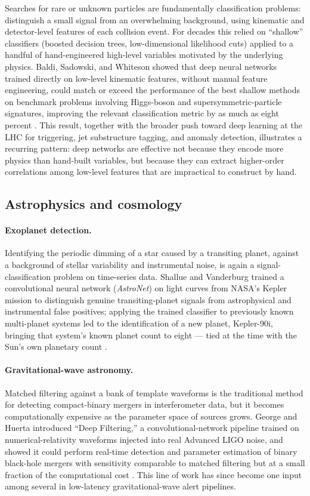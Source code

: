 \documentclass[11pt]{article}
\begin{document}
Searches for rare or unknown particles are fundamentally classification problems: distinguish a small signal from an overwhelming background, using kinematic and detector-level features of each collision event. For decades this relied on ``shallow'' classifiers (boosted decision trees, low-dimensional likelihood cuts) applied to a handful of hand-engineered high-level variables motivated by the underlying physics. Baldi, Sadowski, and Whiteson showed that deep neural networks trained directly on low-level kinematic features, without manual feature engineering, could match or exceed the performance of the best shallow methods on benchmark problems involving Higgs-boson and supersymmetric-particle signatures, improving the relevant classification metric by as much as eight percent \cite{baldi2014}. This result, together with the broader push toward deep learning at the LHC for triggering, jet substructure tagging, and anomaly detection, illustrates a recurring pattern: deep networks are effective not because they encode more physics than hand-built variables, but because they can extract higher-order correlations among low-level features that are impractical to construct by hand.

\subsection{Astrophysics and cosmology}

\paragraph{Exoplanet detection.} Identifying the periodic dimming of a star caused by a transiting planet, against a background of stellar variability and instrumental noise, is again a signal-classification problem on time-series data. Shallue and Vanderburg trained a convolutional neural network (\emph{AstroNet}) on light curves from NASA's Kepler mission to distinguish genuine transiting-planet signals from astrophysical and instrumental false positives; applying the trained classifier to previously known multi-planet systems led to the identification of a new planet, Kepler-90i, bringing that system's known planet count to eight --- tied at the time with the Sun's own planetary count \cite{shallue2018}.

\paragraph{Gravitational-wave astronomy.} Matched filtering against a bank of template waveforms is the traditional method for detecting compact-binary mergers in interferometer data, but it becomes computationally expensive as the parameter space of sources grows. George and Huerta introduced ``Deep Filtering,'' a convolutional-network pipeline trained on numerical-relativity waveforms injected into real Advanced LIGO noise, and showed it could perform real-time detection and parameter estimation of binary black-hole mergers with sensitivity comparable to matched filtering but at a small fraction of the computational cost \cite{george2018}. This line of work has since become one input among several in low-latency gravitational-wave alert pipelines.
\end{document}
